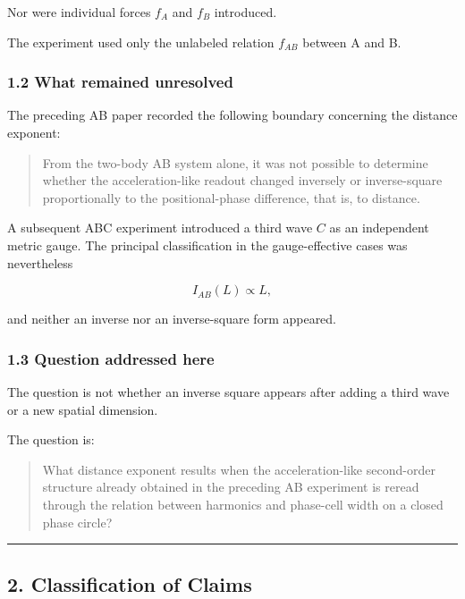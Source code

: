 \documentclass[
  a4paper,
]{article}
\begin{document}
Nor were individual forces \(f_A\) and \(f_B\) introduced.

The experiment used only the unlabeled relation \(f_{AB}\) between A and
B.

\subsubsection{1.2 What remained
unresolved}\label{what-remained-unresolved}

The preceding AB paper recorded the following boundary concerning the
distance exponent:

\begin{quote}
From the two-body AB system alone, it was not possible to determine
whether the acceleration-like readout changed inversely or
inverse-square proportionally to the positional-phase difference, that
is, to distance.
\end{quote}

A subsequent ABC experiment introduced a third wave \(C\) as an
independent metric gauge. The principal classification in the
gauge-effective cases was nevertheless

\[
I_{AB}(L)\propto L,
\]

and neither an inverse nor an inverse-square form appeared.

\subsubsection{1.3 Question addressed
here}\label{question-addressed-here}

The question is not whether an inverse square appears after adding a
third wave or a new spatial dimension.

The question is:

\begin{quote}
What distance exponent results when the acceleration-like second-order
structure already obtained in the preceding AB experiment is reread
through the relation between harmonics and phase-cell width on a closed
phase circle?
\end{quote}

\begin{center}\rule{0.5\linewidth}{0.5pt}\end{center}

\subsection{2. Classification of Claims}\label{classification-of-claims}
\end{document}
